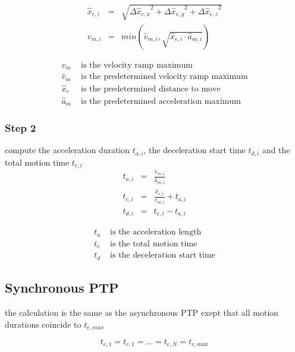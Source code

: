 \documentclass[professionalfonts, 
               xcolor={ usenames, %
                        dvipsnames,%
                        svgnames,%
                        table,%
                        hyperref%
                      }
              ]{beamer}
\begin{document}
\begin{frame}
\begin{eqnarray}
\hat{x}_{e,i} & = & \sqrt{{\Delta\hat{x}_{e,x}}^{2} + {\Delta\hat{x}_{e,y}}^{2} + {\Delta\hat{x}_{e,z}}^{2} } \\
v_{m,i } & = & min(\hat{v}_{m,i},\sqrt{\hat{x}_{e,i} \cdot \hat{a}_{m,i}})  \label{eq:asynvmi}
\end{eqnarray}

\begin{align*}
v_{m} & \text{ is the velocity ramp maximum} \\
\hat{v}_{m} & \text{ is the predetermined velocity ramp maximum} \\
\hat{x}_{e} & \text{ is the predetermined distance to move} \\
\hat{a}_{m} & \text{ is the predetermined acceleration maximum} 
\end{align*}
\end{frame}

\subsubsection{Step 2}
\begin{frame}
compute the acceleration duration $t_{a,i}$, the deceleration start time $t_{d,i}$ and the total motion time $t_{e,i}$
\begin{eqnarray}
t_{a,i} & = & \frac{v_{m,i}}{\hat{a}_{m,i}} \\
t_{e,i} & = & \frac{\hat{x}_{e,i}}{v_{m,i}} + t_{a,i} \\
t_{d,i} & = & t_{e,i} - t_{a,i}
\end{eqnarray}

\begin{align*}
t_{a} & \text{ is the acceleration length} \\
t_{e} & \text{ is the total motion time} \\
t_{d} & \text{ is the deceleration start time}
\end{align*}
\end{frame}
  
\subsection{Synchronous PTP}
\begin{frame}
the calculation is the same as the asynchronous PTP
exept that all motion durations coincide to $t_{e,max}$

\begin{equation*}
t_{e,1} = t_{e,1} = ... = t_{e,N} = t_{e,max}
\end{equation*}
\end{frame}
\end{document}
